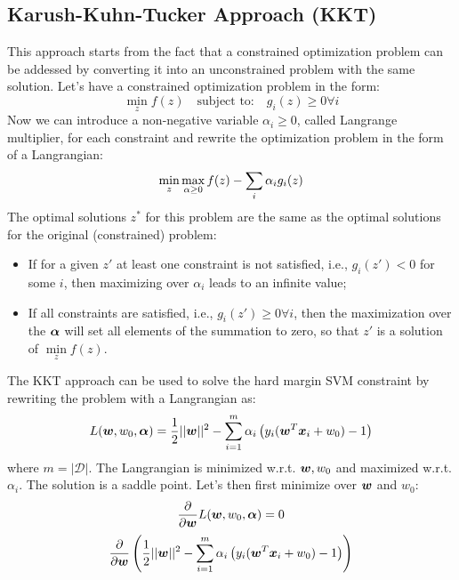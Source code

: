 \subsection{Karush-Kuhn-Tucker Approach (KKT)}
This approach starts from the fact that a constrained optimization problem can be addessed by converting it into an unconstrained problem with the same solution. \newline
Let's have a constrained optimization problem in the form:
\[\min\limits_zf(z)\quad\text{subject to:}\quad g_i(z)\geq 0\forall i\]
Now we can introduce a non-negative variable $\alpha_i\geq0$, called Langrange multiplier, for each constraint and rewrite the optimization problem in the form of a Langrangian:
\[\min\limits_z\max\limits_{\alpha\geq0}f(z)-\displaystyle\sum_i\alpha_ig_i(z)\]
The optimal solutions $z^*$ for this problem are the same as the optimal solutions for the original (constrained) problem:
\begin{itemize}
  \item If for a given $z'$ at least one constraint is not satisfied, i.e., $g_i(z')<0$ for some $i$, then maximizing over $\alpha_i$ leads to an infinite value;
  \item If all constraints are satisfied, i.e., $g_i(z')\geq0\forall i$, then the maximization over the $\bm{\alpha}$ will set all elements of the summation to zero, so that $z'$ is a solution of $\min\limits_zf(z)$.
\end{itemize}
The KKT approach can be used to solve the hard margin SVM constraint by rewriting the problem with a Langrangian as: 
\[L(\bm{w},w_0,\bm{\alpha})=\frac{1}{2}\vert\vert\bm{w}\vert\vert^2-\displaystyle\sum_{i=1}^m\alpha_i\left(y_i(\bm{w}^T\bm{x}_i+w_0)-1\right)\]
where $m=\vert\mathcal{D}\vert$.
The Langrangian is minimized w.r.t. $\bm{w}, w_0$ and maximized w.r.t. $\alpha_i$. The solution is a saddle point. \newline
Let's then first minimize over $\bm{w}$ and $w_0$:
\[\frac{\partial}{\partial\bm{w}}L(\bm{w},w_0,\bm{\alpha})=0\]
\[\frac{\partial}{\partial\bm{w}}\left(\frac{1}{2}\vert\vert\bm{w}\vert\vert^2-\displaystyle\sum_{i=1}^m\alpha_i\left(y_i(\bm{w}^T\bm{x}_i+w_0)-1\right)\right)\]

